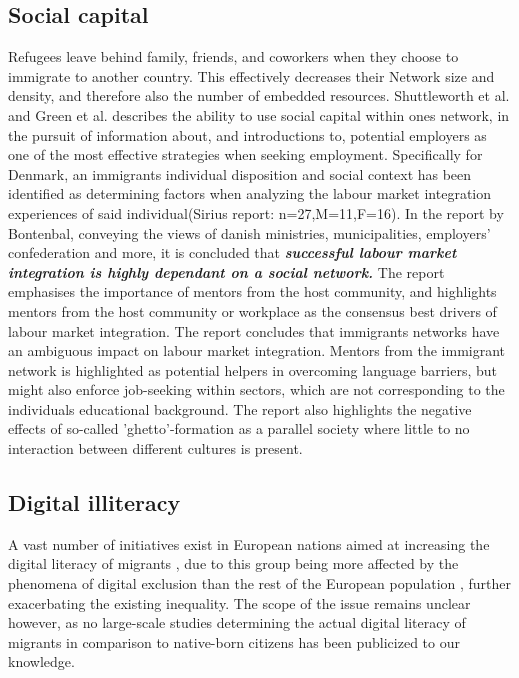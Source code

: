 \subsection{Social capital}
Refugees leave behind family, friends, and coworkers when they choose to immigrate to another country. This effectively decreases their Network size and density, and therefore also the number of embedded resources. 
Shuttleworth et al.\cite{shuttleworth2008incapacity} and Green et al.\cite{green2011job} describes the ability to use social capital within ones network, in the pursuit of information about, and introductions to, potential employers as one of the most effective strategies when seeking employment. Specifically for Denmark, an immigrants individual disposition and social context has been identified as determining factors when analyzing the labour market integration experiences of said individual\cite{Sirius}(Sirius report: n=27,M=11,F=16). In the report by Bontenbal\cite{Bontenbal2019}, conveying the views of danish ministries, municipalities, employers' confederation and more, it is concluded that \textbf{\emph{successful labour market integration is highly dependant on a social network.}} The report emphasises the importance of mentors from the host community, and highlights mentors from the host community or workplace as the consensus best drivers of labour market integration. The report concludes that immigrants networks have an ambiguous impact on labour market integration. Mentors from the immigrant network is highlighted as potential helpers in overcoming language barriers, but might also enforce job-seeking within sectors, which are not corresponding to the individuals educational background. The report also highlights the negative effects of so-called 'ghetto'-formation as a parallel society where little to no interaction between different cultures is present. 


\subsection{Digital illiteracy}

A vast number of initiatives exist in European nations aimed at increasing the digital literacy of migrants \cite{EU2019}, due to this group being more affected by the phenomena of digital exclusion than the rest of the European population \cite{EU2006}, further exacerbating the existing inequality. The scope of the issue remains unclear however, as no large-scale studies determining the actual digital literacy of migrants in comparison to native-born citizens has been publicized to our knowledge.

